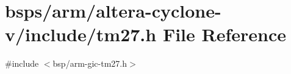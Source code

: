\hypertarget{arm_2altera-cyclone-v_2include_2tm27_8h}{}\section{bsps/arm/altera-\/cyclone-\/v/include/tm27.h File Reference}
\label{arm_2altera-cyclone-v_2include_2tm27_8h}
{\ttfamily \#include $<$bsp/arm-\/gic-\/tm27.\+h$>$}\newline
